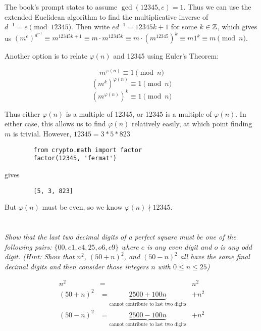 \documentclass[12pt]{article}
\begin{document}
    The book's prompt states to assume $\gcd(12345, e) = 1$. Thus we can use the extended Euclidean algorithm to find the multiplicative inverse of $d^{-1} = e \pmod{12345}$. Then write $e d^{-1} = 12345k + 1$ for some $k \in \mathbb{Z}$, which gives us ${(m^e)}^{d^{-1}} \equiv m^{12345k + 1} \equiv m \cdot m^{12345k} \equiv m \cdot {(m^{12345})}^k \equiv m 1^k \equiv m \pmod{n}$.

    Another option is to relate $\varphi(n)$ and 12345 using Euler's Theorem:

    $$m^{\varphi(n)} \equiv 1 \pmod{n}$$
    $${(m^k)}^{\varphi(n)} \equiv 1 \pmod{n}$$
    $${(m^{\varphi(n)})}^{k} \equiv 1 \pmod{n}$$

    Thus either $\varphi(n)$ is a multiple of 12345, or 12345 is a multiple of $\varphi(n)$. In either case, this allows us to find $\varphi(n)$ relatively easily, at which point finding $m$ is trivial. However, $12345 = 3 * 5 * 823$

    \begin{verbatim}
        from crypto.math import factor
        factor(12345, 'fermat')
    \end{verbatim}

    gives

    \begin{verbatim}
        [5, 3, 823]
    \end{verbatim}

    But $\varphi(n)$ must be even, so we know $\varphi(n) \nmid 12345$.

\section{}
    \subsection{} \textit{Show that the last two decimal digits of a perfect square must be one of the following pairs: $\{00, e1, e4, 25, o6, e9\}$ where $e$ is any even digit and $o$ is any odd digit. (Hint: Show that $n^2$, ${(50 + n)}^2$, and ${(50 - n)}^2$ all have the same final decimal digits and then consider those integers $n$ with $0 \leq n \leq 25$)}

    \begin{align*}
        n^2 &= &n^2\\
        {(50 + n)}^2 &= \underbrace{2500 + 100n}_{\text{cannot contribute to last two digits}} &+ n^2\\
        {(50 - n)}^2 &= \underbrace{2500 - 100n}_{\text{cannot contribute to last two digits}} &+ n^2\\
    \end{align*}
\end{document}
